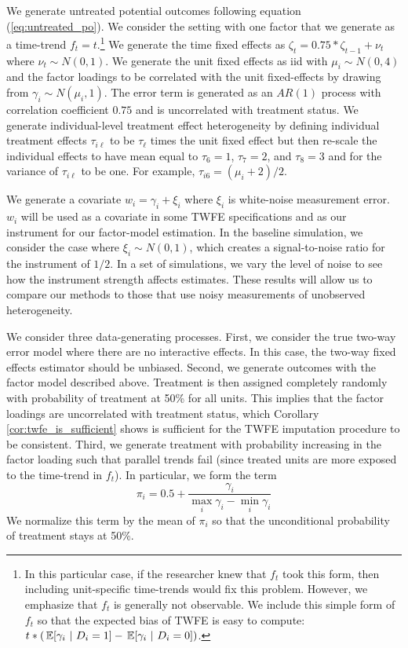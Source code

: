 \documentclass[12pt]{article}
\begin{document}
We generate untreated potential outcomes following equation (\ref{eq:untreated_po}). We consider the setting with one factor that we generate as a time-trend $f_t = t$.\footnote{In this particular case, if the researcher knew that $f_t$ took this form, then including unit-specific time-trends would fix this problem. However, we emphasize that $f_t$ is generally not observable. We include this simple form of $f_t$ so that the expected bias of TWFE is easy to compute: $t * (\expec{\gamma_i}{D_i = 1} - \expec{\gamma_i}{D_i = 0 })$.} We generate the time fixed effects as $\zeta_t = 0.75 * \zeta_{t-1} + \nu_{t}$ where $\nu_{t} \sim N(0,1)$. We generate the unit fixed effects as iid with $\mu_i \sim N(0, 4)$ and the factor loadings to be correlated with the unit fixed-effects by drawing from $\gamma_i \sim N(\mu_i, 1)$. The error term is generated as an $AR(1)$ process with correlation coefficient $0.75$ and is uncorrelated with treatment status. We generate individual-level treatment effect heterogeneity by defining individual treatment effects $\tau_{i\ell}$ to be $\tau_\ell$ times the unit fixed effect but then re-scale the individual effects to have mean equal to $\tau_6 = 1$, $\tau_7 = 2$, and $\tau_8 = 3$ and for the variance of $\tau_{i\ell}$ to be one. For example, $\tau_{i6} = (\mu_i + 2)/2$. 

We generate a covariate $w_i = \gamma_i + \xi_i$ where $\xi_i$ is white-noise measurement error. $w_i$ will be used as a covariate in some TWFE specifications and as our instrument for our factor-model estimation. In the baseline simulation, we consider the case where $\xi_i \sim N(0, 1)$, which creates a signal-to-noise ratio for the instrument of $1/2$. In a set of simulations, we vary the level of noise to see how the instrument strength affects estimates. These results will allow us to compare our methods to those that use noisy measurements of unobserved heterogeneity.

We consider three data-generating processes. First, we consider the true two-way error model where there are no interactive effects. In this case, the two-way fixed effects estimator should be unbiased. Second, we generate outcomes with the factor model described above. Treatment is then assigned completely randomly with probability of treatment at 50\% for all units. This implies that the factor loadings are uncorrelated with treatment status, which Corollary \ref{cor:twfe_is_sufficient} shows is sufficient for the TWFE imputation procedure to be consistent. Third, we generate treatment with probability increasing in the factor loading such that parallel trends fail (since treated units are more exposed to the time-trend in $f_t$). In particular, we form the term
\begin{equation}
\pi_i = 0.5 + \frac{\gamma_{i}}{\max_i \gamma_i - \min_i \gamma_i}
\end{equation}
We normalize this term by the mean of $\pi_i$ so that the unconditional probability of treatment stays at 50\%.
\end{document}
